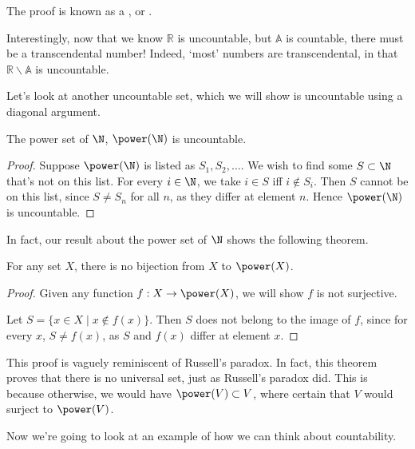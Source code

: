 \documentclass[a4paper]{scrartcl}
\begin{document}
The proof is known as a , or . 

Interestingly, now that we know $\mathbb{R}$ is uncountable, but $\mathbb{A}$ is countable, there must be a transcendental number! Indeed, `most' numbers are transcendental, in that $\mathbb{R} \backslash \mathbb{A}$ is uncountable.

Let's look at another uncountable set, which we will show is uncountable using a diagonal argument.

\begin{theorem}
	The power set of $\N$, $\power(\N)$ is uncountable.
\end{theorem}
\begin{proof}
	Suppose $\power(\N)$ is listed as $S_1, S_2, \dots$. We wish to find some $S \subset \N$ that's not on this list.
	For every $i \in \N$, we take $i \in S$ iff $i \not \in S_i$. Then $S$ cannot be on this list, since $S \neq S_n$ for all $n$, as they differ at element $n$.
	Hence $\power(\N)$ is uncountable.
\end{proof}


In fact, our result about the power set of $\N$ shows the following theorem.
\begin{theorem}
	For any set $X$, there is no bijection from $X$ to $\power(X)$.
\end{theorem}
\begin{proof}
	Given any function $f: X \rightarrow \power(X)$, we will show $f$ is not surjective.

	Let $S = \{x \in X \mid x \not \in f(x) \}$. Then $S$ does not belong to the image of $f$, since for every $x$, $S \neq f(x)$, as $S$ and $f(x)$ differ at element $x$.
\end{proof}

\begin{remark}
	This proof is vaguely reminiscent of Russell's paradox. In fact, this theorem proves that there is no universal set, just as Russell's paradox did. This is because otherwise, we would have $\power(V) \subset V$, where certain that $V$ would surject to $\power(V)$.
\end{remark}

Now we're going to look at an example of how we can think about countability.
\end{document}
